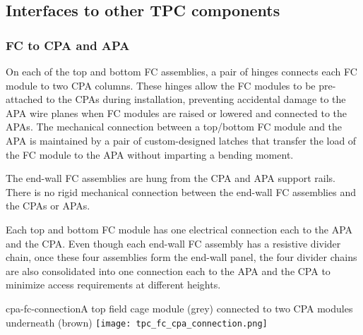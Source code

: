 
\subsection{Interfaces to other TPC components}

\subsubsection{FC to CPA and APA}

On each of the top and bottom FC assemblies, a pair of hinges connects each FC module to two CPA columns. These hinges allow the FC modules to be pre-attached to the CPAs during installation, preventing accidental damage to the APA wire planes when FC modules are raised or lowered and connected to the APAs.  The mechanical connection between a top/bottom FC module and the APA is maintained by a pair of custom-designed latches that transfer the load of the FC module to the APA without imparting a bending moment.

The end-wall FC assemblies are hung from the CPA and APA support rails.  There is no rigid mechanical connection 
between the end-wall FC assemblies and the CPAs or APAs. 

Each top and bottom FC module has one electrical connection each to the APA and the CPA. Even though each end-wall FC assembly has a resistive divider chain, once these four assemblies form the end-wall panel, the four divider chains are also consolidated into one connection each to the APA and the CPA to minimize  access requirements at different heights. 

\begin{cdrfigure}{cpa-fc-connection}{A top field cage module (grey) connected to two CPA modules underneath (brown)}
\texttt{[image: tpc\_fc\_cpa\_connection.png]}
\end{cdrfigure}

